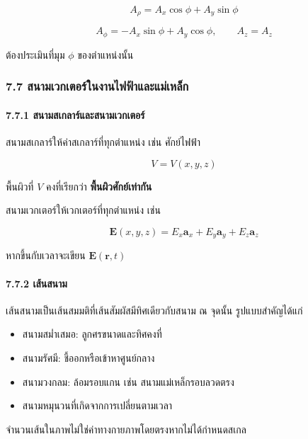 \[
A_\rho=A_x\cos\phi+A_y\sin\phi
\]

\[
A_\phi=-A_x\sin\phi+A_y\cos\phi,\qquad A_z=A_z
\]

ต้องประเมินที่มุม \(\phi\) ของตำแหน่งนั้น

\subsubsection{7.7 สนามเวกเตอร์ในงานไฟฟ้าและแม่เหล็ก}

\paragraph{7.7.1 สนามสเกลาร์และสนามเวกเตอร์}

สนามสเกลาร์ให้ค่าสเกลาร์ที่ทุกตำแหน่ง เช่น ศักย์ไฟฟ้า

\[
V=V(x,y,z)
\]

พื้นผิวที่ \(V\) คงที่เรียกว่า \textbf{พื้นผิวศักย์เท่ากัน}

สนามเวกเตอร์ให้เวกเตอร์ที่ทุกตำแหน่ง เช่น

\[
\mathbf{E}(x,y,z)=E_x\mathbf{a}_x+E_y\mathbf{a}_y+E_z\mathbf{a}_z
\]

หากขึ้นกับเวลาจะเขียน \(\mathbf{E}(\mathbf{r},t)\)

\paragraph{7.7.2 เส้นสนาม}

เส้นสนามเป็นเส้นสมมติที่เส้นสัมผัสมีทิศเดียวกับสนาม ณ จุดนั้น รูปแบบสำคัญได้แก่

\begin{itemize}
\item สนามสม่ำเสมอ: ลูกศรขนาดและทิศคงที่
\item สนามรัศมี: ชี้ออกหรือเข้าหาศูนย์กลาง
\item สนามวงกลม: ล้อมรอบแกน เช่น สนามแม่เหล็กรอบลวดตรง
\item สนามหมุนวนที่เกิดจากการเปลี่ยนตามเวลา
\end{itemize}

จำนวนเส้นในภาพไม่ใช่ค่าทางกายภาพโดยตรงหากไม่ได้กำหนดสเกล


